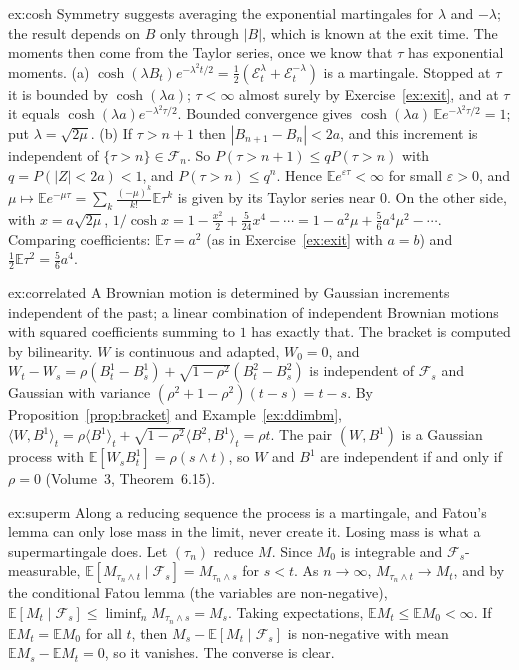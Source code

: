 \begin{solution}{ex:cosh}
\idea Symmetry suggests averaging the exponential martingales for $\lambda$ and $-\lambda$; the result depends on $B$ only through $|B|$, which is known at the exit time. The moments then come from the Taylor
series, once we know that $\tau$ has exponential moments.
\writeup (a) $\cosh(\lambda B_t)e^{-\lambda^2t/2}=\frac12(\mathcal E^\lambda_t+\mathcal E^{-\lambda}_t)$ is a martingale. Stopped at $\tau$ it is bounded by $\cosh(\lambda a)$; $\tau<\infty$ almost surely by Exercise~\ref{ex:exit}, and at
$\tau$ it equals $\cosh(\lambda a)e^{-\lambda^2\tau/2}$. Bounded convergence gives $\cosh(\lambda a)\,\mathbb Ee^{-\lambda^2\tau/2}=1$; put $\lambda=\sqrt{2\mu}$.
(b) If $\tau>n+1$ then $|B_{n+1}-B_n|<2a$, and this increment is independent of $\{\tau>n\}\in\mathcal F_n$. So $P(\tau>n+1)\le qP(\tau>n)$ with $q=P(|Z|<2a)<1$, and $P(\tau>n)\le q^n$. Hence
$\mathbb Ee^{\varepsilon\tau}<\infty$ for small $\varepsilon>0$, and $\mu\mapsto\mathbb Ee^{-\mu\tau}=\sum_k\frac{(-\mu)^k}{k!}\mathbb E\tau^k$ is given by its Taylor series near $0$. On the other side, with $x=a\sqrt{2\mu}$,
$1/\cosh x=1-\frac{x^2}2+\frac5{24}x^4-\cdots=1-a^2\mu+\frac56a^4\mu^2-\cdots$. Comparing coefficients: $\mathbb E\tau=a^2$ (as in Exercise~\ref{ex:exit} with $a=b$) and $\frac12\mathbb E\tau^2=\frac56a^4$.
\end{solution}

\begin{solution}{ex:correlated}
\idea A Brownian motion is determined by Gaussian increments independent of the past; a linear combination of independent Brownian motions with squared coefficients summing to $1$ has exactly that. The
bracket is computed by bilinearity.
\writeup $W$ is continuous and adapted, $W_0=0$, and $W_t-W_s=\rho(B^1_t-B^1_s)+\sqrt{1-\rho^2}(B^2_t-B^2_s)$ is independent of $\mathcal F_s$ and Gaussian with variance $(\rho^2+1-\rho^2)(t-s)=t-s$. By Proposition~\ref{prop:bracket}
and Example~\ref{ex:ddimbm}, $\langle W,B^1\rangle_t=\rho\langle B^1\rangle_t+\sqrt{1-\rho^2}\langle B^2,B^1\rangle_t=\rho t$. The pair $(W,B^1)$ is a Gaussian process with $\mathbb E[W_sB^1_t]=\rho(s\wedge t)$, so
$W$ and $B^1$ are independent if and only if $\rho=0$ (Volume~3, Theorem~6.15).
\end{solution}

\begin{solution}{ex:superm}
\idea Along a reducing sequence the process is a martingale, and Fatou's lemma can only lose mass in the limit, never create it. Losing mass is what a supermartingale does.
\writeup Let $(\tau_n)$ reduce $M$. Since $M_0$ is integrable and $\mathcal F_s$-measurable, $\mathbb E[M_{\tau_n\wedge t}\mid\mathcal F_s]=M_{\tau_n\wedge s}$ for $s<t$. As $n\to\infty$, $M_{\tau_n\wedge t}\to M_t$, and by the
conditional Fatou lemma (the variables are non-negative), $\mathbb E[M_t\mid\mathcal F_s]\le\liminf_nM_{\tau_n\wedge s}=M_s$. Taking expectations, $\mathbb EM_t\le\mathbb EM_0<\infty$. If $\mathbb EM_t=\mathbb EM_0$ for all $t$,
then $M_s-\mathbb E[M_t\mid\mathcal F_s]$ is non-negative with mean $\mathbb EM_s-\mathbb EM_t=0$, so it vanishes. The converse is clear.
\end{solution}

